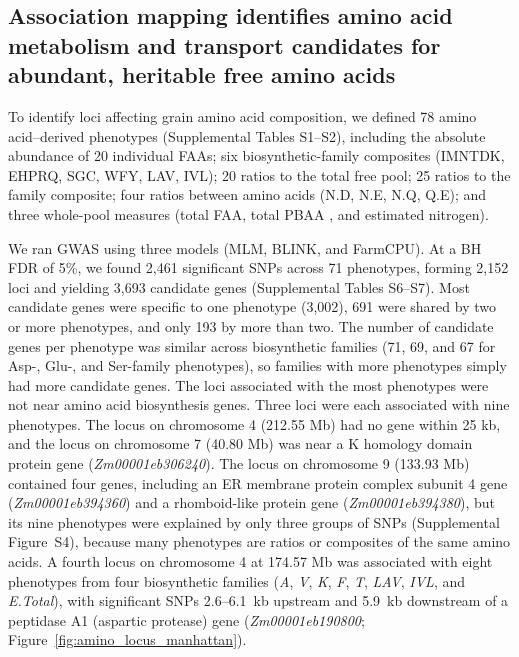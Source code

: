 \documentclass[namedate,unnumsec,webpdf,contemporary,large]{oup-authoring-template}
\begin{document}
\subsection{Association mapping identifies amino acid metabolism and transport candidates for abundant, heritable free amino acids}

To identify loci affecting grain amino acid composition, we defined 78 amino acid–derived phenotypes (Supplemental Tables S1--S2), including the absolute abundance of 20 individual FAAs; six biosynthetic-family composites (IMNTDK, EHPRQ, SGC, WFY, LAV, IVL); 20 ratios to the total free pool; 25 ratios to the family composite; four ratios between amino acids (N.D, N.E, N.Q, Q.E); and three whole-pool measures (total FAA, total PBAA \citep{Shrestha2022}, and estimated nitrogen).

We ran GWAS using three models (MLM, BLINK, and FarmCPU). At a BH FDR of 5\%, we found 2,461 significant SNPs across 71 phenotypes, forming 2,152 loci and yielding 3,693 candidate genes (Supplemental Tables S6--S7). Most candidate genes were specific to one phenotype (3,002), 691 were shared by two or more phenotypes, and only 193 by more than two. The number of candidate genes per phenotype was similar across biosynthetic families (71, 69, and 67 for Asp-, Glu-, and Ser-family phenotypes), so families with more phenotypes simply had more candidate genes. The loci associated with the most phenotypes were not near amino acid biosynthesis genes. Three loci were each associated with nine phenotypes. The locus on chromosome 4 (212.55 Mb) had no gene within 25 kb, and the locus on chromosome 7 (40.80 Mb) was near a K homology domain protein gene (\textit{Zm00001eb306240}). The locus on chromosome 9 (133.93 Mb) contained four genes, including an ER membrane protein complex subunit 4 gene (\textit{Zm00001eb394360}) and a rhomboid-like protein gene (\textit{Zm00001eb394380}), but its nine phenotypes were explained by only three groups of SNPs (Supplemental Figure~S4), because many phenotypes are ratios or composites of the same amino acids. A fourth locus on chromosome 4 at 174.57 Mb was associated with eight phenotypes from four biosynthetic families (\textit{A}, \textit{V}, \textit{K}, \textit{F}, \textit{T}, \textit{LAV}, \textit{IVL}, and \textit{E.Total}), with significant SNPs 2.6--6.1~kb upstream and 5.9~kb downstream of a peptidase A1 (aspartic protease) gene (\textit{Zm00001eb190800}; Figure~\ref{fig:amino_locus_manhattan}).
\end{document}
